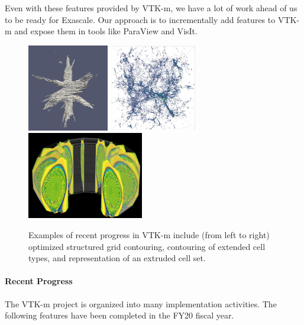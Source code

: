 Even with these features provided by VTK-m, we have a lot of work ahead of us to be ready for Exascale.
Our approach is to incrementally add features to VTK-m and expose them in tools like ParaView and VisIt.


\begin{figure}[t]
  \centering
  \includegraphics[height=1.5in]{projects/2.3.4-DataViz/2.3.4.13-ECP-VTK-m/VTKm-flying-edges}\quad
  \includegraphics[height=1.5in]{projects/2.3.4-DataViz/2.3.4.13-ECP-VTK-m/VTKm-contour-cell-types}\quad
  \includegraphics[height=1.5in]{projects/2.3.4-DataViz/2.3.4.13-ECP-VTK-m/VTKm-extruded-cell-set}\quad
  \caption{
    Examples of recent progress in VTK-m include (from left to right) optimized structured grid contouring, contouring of extended cell types, and representation of an extruded cell set.
  }
  \label{fig:VTKmRecent}
\end{figure}

\paragraph{Recent Progress}
The VTK-m project is organized into many implementation activities.
The following features have been completed in the FY20 fiscal year.

